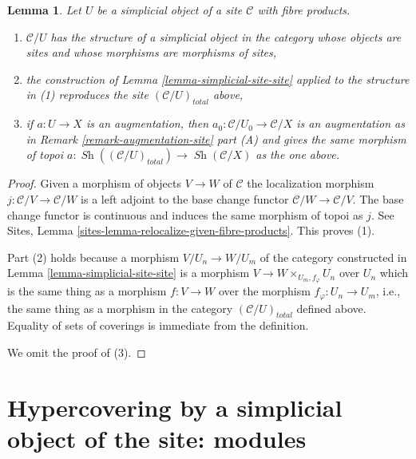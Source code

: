 \documentclass{stacks-project}
\theoremstyle{plain}
\newtheorem{lemma}[subsection]{Lemma}
\theoremstyle{definition}
\theoremstyle{remark}
\numberwithin{equation}{subsection}
\def\Sh{\mathop{\mathit{Sh}}\nolimits}
\begin{document}
\begin{lemma}
\label{lemma-sr-when-fibre-products}
Let $U$ be a simplicial object of a site $\mathcal{C}$
with fibre products.
\begin{enumerate}
\item $\mathcal{C}/U$ has the structure of a simplicial object
in the category whose objects are sites and
whose morphisms are morphisms of sites,
\item the construction of Lemma \ref{lemma-simplicial-site-site}
applied to the structure in (1)
reproduces the site $(\mathcal{C}/U)_{total}$ above,
\item if $a : U \to X$ is an augmentation, then
$a_0 : \mathcal{C}/U_0 \to \mathcal{C}/X$ is an augmentation
as in Remark \ref{remark-augmentation-site} part (A) and gives the
same morphism of topoi
$a : \Sh((\mathcal{C}/U)_{total}) \to \Sh(\mathcal{C}/X)$
as the one above.
\end{enumerate}
\end{lemma}

\begin{proof}
Given a morphism of objects $V \to W$ of $\mathcal{C}$ the localization
morphism $j : \mathcal{C}/V \to \mathcal{C}/W$ is a left adjoint to
the base change functor $\mathcal{C}/W \to \mathcal{C}/V$.
The base change functor is continuous and induces the same morphism of
topoi as $j$. See
Sites, Lemma \ref{sites-lemma-relocalize-given-fibre-products}.
This proves (1).

\medskip\noindent
Part (2) holds because a morphism $V/U_n \to W/U_m$
of the category constructed
in Lemma \ref{lemma-simplicial-site-site}
is a morphism $V \to W \times_{U_m, f_\varphi} U_n$ over $U_n$
which is the same thing as a morphism $f : V \to W$
over the morphism $f_\varphi : U_n \to U_m$, i.e.,
the same thing as a morphism in the category $(\mathcal{C}/U)_{total}$
defined above. Equality of sets of coverings is
immediate from the definition.

\medskip\noindent
We omit the proof of (3).
\end{proof}







\section{Hypercovering by a simplicial object of the site: modules}
\label{section-hypercovering-modules}
\end{document}
